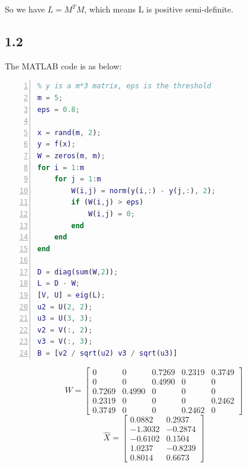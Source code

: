 \documentclass[a4paper, 11pt]{article}
\begin{document}
So we have $L = M^TM$, which means L is positive semi-definite.

\subsection*{1.2}
The MATLAB code is as below:
\begin{lstlisting}[language = Matlab, numbers=left,   
  numberstyle=\tiny,keywordstyle=\color{blue!70},  
  commentstyle=\color{red!50!green!50!blue!50},frame=shadowbox,  
  rulesepcolor=\color{red!20!green!20!blue!20},basicstyle=\ttfamily,
  tabsize=2]
% routine to construct W
% y is a m*3 matrix, eps is the threshold
m = 5;
eps = 0.8;

x = rand(m, 2);
y = f(x);
W = zeros(m, m);
for i = 1:m
	for j = 1:m
		W(i,j) = norm(y(i,:) - y(j,:), 2);
		if (W(i,j) > eps)
			W(i,j) = 0;
		end
	end
end

D = diag(sum(W,2));
L = D - W;
[V, U] = eig(L);
u2 = U(2, 2);
u3 = U(3, 3);
v2 = V(:, 2);
v3 = V(:, 3);
B = [v2 / sqrt(u2) v3 / sqrt(u3)]
\end{lstlisting}
$$
W =
\begin{bmatrix}
         0 &       0 &  0.7269 &  0.2319 &  0.3749 \\
         0 &       0 &  0.4990 &       0 &       0 \\
    0.7269 &  0.4990 &       0 &       0 &       0 \\
    0.2319 &       0 &       0 &       0 &  0.2462 \\
    0.3749 &       0 &       0 &  0.2462 &       0
\end{bmatrix}
$$
$$
\hat{X} =
\begin{bmatrix}
    0.0882 &   0.2937 \\
   -1.3032 &  -0.2874 \\
   -0.6102 &   0.1504 \\
    1.0237 &  -0.8239 \\
    0.8014 &   0.6673
\end{bmatrix}
$$
\end{document}
